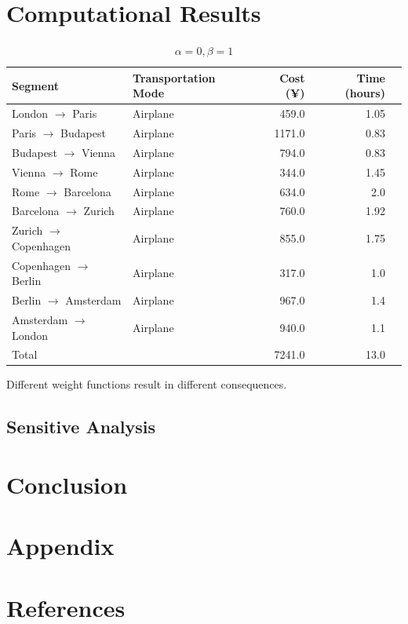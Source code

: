 \documentclass{extarticle}
\begin{document}
\section{Computational Results}
\begin{table}[!ht]
  \centering
  \begin{tabular}{llrrr}
    \toprule
    Segment                          & Transportation Mode & Cost (¥) & Time (hours) \\
    \midrule
    London $\rightarrow$  Paris      & Airplane            & 459.0    & 1.05         \\
    Paris $\rightarrow$  Budapest    & Airplane            & 1171.0   & 0.83         \\
    Budapest $\rightarrow$  Vienna   & Airplane            & 794.0    & 0.83         \\
    Vienna $\rightarrow$  Rome       & Airplane            & 344.0    & 1.45         \\
    Rome $\rightarrow$  Barcelona    & Airplane            & 634.0    & 2.0          \\
    Barcelona $\rightarrow$  Zurich  & Airplane            & 760.0    & 1.92         \\
    Zurich $\rightarrow$  Copenhagen & Airplane            & 855.0    & 1.75         \\
    Copenhagen $\rightarrow$  Berlin & Airplane            & 317.0    & 1.0          \\
    Berlin $\rightarrow$  Amsterdam  & Airplane            & 967.0    & 1.4          \\
    Amsterdam $\rightarrow$  London  & Airplane            & 940.0    & 1.1          \\
    \midrule
    Total                            &                     & 7241.0   & 13.0         \\
    \bottomrule
  \end{tabular}
  \caption{$\alpha=0, \beta=1$}%
  \label{tab:city-travel}
\end{table}
Different weight functions result in different
consequences\cite{lamport1994latex}.
\subsection*{Sensitive Analysis}
\section{Conclusion}
\section{Appendix}
\section{References}
\printbibliography[heading=none]
\end{document}
